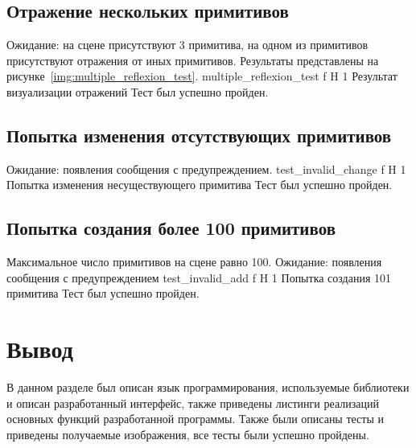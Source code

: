 \subsection{Отражение нескольких примитивов}
Ожидание: на сцене присутствуют 3 примитива, на одном из примитивов  присутствуют отражения от иных примитивов. Результаты представлены на рисунке~\ref{img:multiple_reflexion_test}.
{multiple_reflexion_test} %
{f} %
{H} %
{1\textwidth} %
{Результат визуализации отражений} %
Тест был успешно пройден.

\subsection{Попытка изменения отсутствующих примитивов}
Ожидание: появления сообщения с предупреждением.
{test_invalid_change} %
{f} %
{H} %
{1\textwidth} %
{Попытка изменения несуществующего примитива} %
Тест был успешно пройден.

\subsection{Попытка создания более 100 примитивов}
Максимальное число примитивов на сцене равно 100.
Ожидание: появления сообщения с предупреждением
{test_invalid_add} %
{f} %
{H} %
{1\textwidth} %
{Попытка создания 101 примитива} %
Тест был успешно пройден.
\section*{Вывод}

В данном разделе был описан язык программирования, используемые библиотеки и описан разработанный интерфейс, также приведены листинги реализаций основных функций разработанной программы. Также были описаны тесты и приведены получаемые изображения, все тесты были успешно пройдены.









